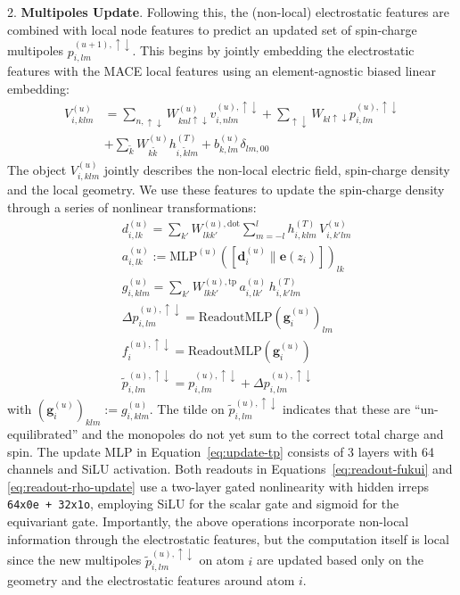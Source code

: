 \documentclass[aps,%
superscriptaddress,
 amsmath,amssymb,
floatfix,
twocolumn
]{revtex4-2}
\begin{document}
2. \textbf{Multipoles Update}. Following this, the (non-local) electrostatic features are combined with local node features to predict an updated set of spin-charge multipoles $p^{(u+1),  \uparrow \downarrow}_{i,lm}$. This begins by jointly embedding the electrostatic features with the MACE local features using an element-agnostic biased linear embedding:
\begin{align}
V_{i,klm}^{(u)} &= \sum_{n,\uparrow \downarrow} W_{knl \uparrow \downarrow}^{(u)} v_{i,nlm}^{(u), \uparrow \downarrow} +  \sum_{\uparrow \downarrow} W_{kl\uparrow \downarrow} p_{i,lm }^{(u), \uparrow \downarrow} \\ &+ \sum_{\tilde{k}} W_{k\tilde{k}}^{(u)} h_{i,\tilde{k}lm}^{(T)} + b_{k,lm}^{(u)} \delta_{lm,00}
\end{align}
%
The object $V_{i,klm}^{(u)}$ jointly describes the non-local electric field, spin-charge density and the local geometry.
We use these features to update the spin-charge density through a series of nonlinear transformations:
\begin{align}
\label{eq:update-dot-product}
&  d_{i,lk}^{(u)}
  =
  \sum_{k'} W^{(u),\mathrm{dot}}_{lkk'}
  \sum_{m=-l}^{l}
  h_{i,klm}^{(T)}\,V_{i,k'lm}^{(u)}\\
\label{eq:update-tp}
& a_{i,lk}^{(u)} := \mathrm{MLP}^{(u)}\!\left([\mathbf d_i^{(u)} \| \mathbf e(z_i)]\right)_{lk} \\
&g_{i,klm}^{(u)}= \sum_{k'} W^{(u),\mathrm{tp}}_{lkk'}\,
a_{i,lk'}^{(u)}\, h_{i,k'lm}^{(T)} \\
  \label{eq:readout-rho-update}
&\Delta p_{i,lm}^{(u), \uparrow \downarrow} = \text{ReadoutMLP}(\mathbf{g}_i^{(u)})_{lm} \\
\label{eq:readout-fukui}
&f^{(u), \uparrow \downarrow}_{i} = \text{ReadoutMLP}(\mathbf{g}_i^{(u)}) \\
\label{eq:update-rho}
&\tilde{p}^{(u),  \uparrow \downarrow}_{i,lm} = p^{(u),  \uparrow \downarrow}_{i,lm} + \Delta p_{i,lm}^{(u),  \uparrow \downarrow}
\end{align}
with $(\mathbf{g}_i^{(u)})_{klm} := g_{i,klm}^{(u)}$.
The tilde on $\tilde{p}^{(u),  \uparrow \downarrow}_{i,lm}$ indicates that these are ``un-equilibrated'' and the monopoles do not yet sum to the correct total charge and spin. The update MLP in Equation~\ref{eq:update-tp} consists of 3 layers with 64 channels and SiLU activation. Both readouts in Equations~\ref{eq:readout-fukui} and \ref{eq:readout-rho-update} use a two-layer gated nonlinearity with hidden irreps \texttt{64x0e + 32x1o}, employing SiLU for the scalar gate and sigmoid for the equivariant gate. 
Importantly, the above operations incorporate non-local information through the electrostatic features, but the computation itself is local since the new multipoles $\tilde{p}^{(u),  \uparrow \downarrow}_{i,lm}$ on atom $i$ are updated based only on the geometry and the electrostatic features around atom $i$.
\end{document}
